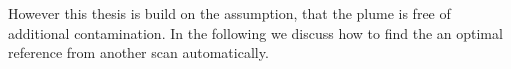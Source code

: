 However this thesis is build on the assumption, that the plume is free of additional contamination. In the following we discuss how to find the an optimal reference from another scan automatically.
\begin{figure}
	\caption{}
	\label{fig:contaminationdependencyso2}
\end{figure}